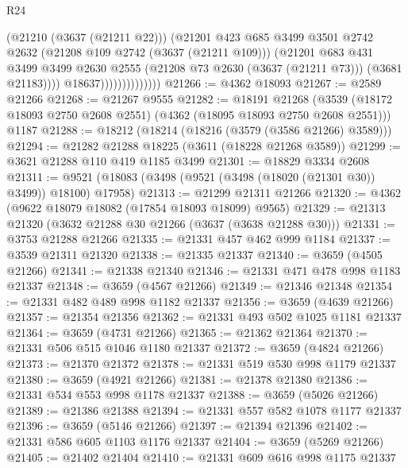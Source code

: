 \begin{lexlean}{R24}
\begin{coremodule}
                                  (@21210 (@3637 (@21211 @22)))
                                  (@21201
                                    @423
                                    @685
                                    @3499
                                    @3501
                                    @2742
                                    @2632
                                    (@21208 @109 @2742 (@3637 (@21211 @109)))
                                    (@21201
                                      @683
                                      @431
                                      @3499
                                      @3499
                                      @2630
                                      @2555
                                      (@21208 @73 @2630 (@3637 (@21211 @73)))
                                      (@3681 @21183))))
                                @18637))))))))))))))
@21266 := @4362 @18093
@21267 := @2589 @21266
@21268 := @21267 @9555
@21282 := @18191
    @21268
    (@3539 (@18172 @18093 @2750 @2608 @2551) (@4362 (@18095 @18093 @2750 @2608 @2551)))
    @1187
@21288 := @18212 (@18214 (@18216 (@3579 (@3586 @21266) @3589)))
@21294 := @21282 @21288 @18225 (@3611 (@18228 @21268 @3589))
@21299 := @3621 @21288 @110 @419 @1185 @3499
@21301 := @18829 @3334 @2608
@21311 := @9521 (@18083 (@3498 (@9521 (@3498 (@18020 (@21301 @30)) @3499)) @18100) @17958)
@21313 := @21299 @21311 @21266
@21320 := @4362 (@9622 @18079 @18082 (@17854 @18093 @18099) @9565)
@21329 := @21313 @21320 (@3632 @21288 @30 @21266 (@3637 (@3638 @21288 @30)))
@21331 := @3753 @21288 @21266
@21335 := @21331 @457 @462 @999 @1184
@21337 := @3539 @21311 @21320
@21338 := @21335 @21337
@21340 := @3659 (@4505 @21266)
@21341 := @21338 @21340
@21346 := @21331 @471 @478 @998 @1183 @21337
@21348 := @3659 (@4567 @21266)
@21349 := @21346 @21348
@21354 := @21331 @482 @489 @998 @1182 @21337
@21356 := @3659 (@4639 @21266)
@21357 := @21354 @21356
@21362 := @21331 @493 @502 @1025 @1181 @21337
@21364 := @3659 (@4731 @21266)
@21365 := @21362 @21364
@21370 := @21331 @506 @515 @1046 @1180 @21337
@21372 := @3659 (@4824 @21266)
@21373 := @21370 @21372
@21378 := @21331 @519 @530 @998 @1179 @21337
@21380 := @3659 (@4921 @21266)
@21381 := @21378 @21380
@21386 := @21331 @534 @553 @998 @1178 @21337
@21388 := @3659 (@5026 @21266)
@21389 := @21386 @21388
@21394 := @21331 @557 @582 @1078 @1177 @21337
@21396 := @3659 (@5146 @21266)
@21397 := @21394 @21396
@21402 := @21331 @586 @605 @1103 @1176 @21337
@21404 := @3659 (@5269 @21266)
@21405 := @21402 @21404
@21410 := @21331 @609 @616 @998 @1175 @21337

\end{coremodule}
\end{lexlean}
